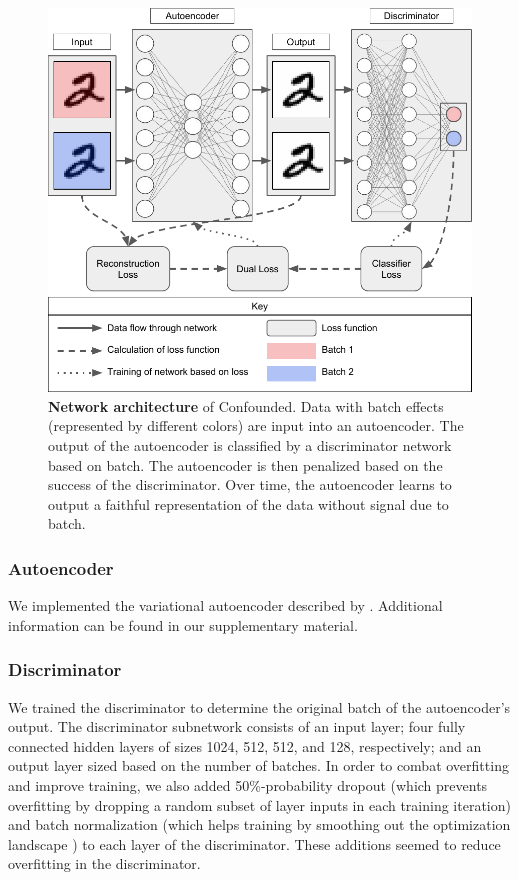 \documentclass[notitlepage]{article}
\begin{document}
\begin{figure}
	\centering
	\includegraphics[width=\columnwidth]{figures/final/network.pdf}
	\caption{\textbf{Network architecture} of Confounded.
	Data with batch effects (represented by different colors) are input into an autoencoder.
	The output of the autoencoder is classified by a discriminator network based on batch.
	The autoencoder is then penalized based on the success of the discriminator.
	Over time, the autoencoder learns to output a faithful representation of the data without signal due to batch.}
	\label{fig:network}
\end{figure}

\subsubsection{Autoencoder}

We implemented the variational autoencoder \cite{louizos_variational_2015} described by \citet[Chapter 15]{geron_hands-machine_2017}.
Additional information can be found in our supplementary material.

\subsubsection{Discriminator}

We trained the discriminator to determine the original batch of the autoencoder's output.
The discriminator subnetwork consists of an input layer; four fully connected hidden layers of sizes 1024, 512, 512, and 128, respectively; and an output layer sized based on the number of batches.
In order to combat overfitting and improve training, we also added 50\%-probability dropout \cite{srivastava_dropout_2014} (which prevents overfitting by dropping a random subset of layer inputs in each training iteration) and batch normalization \cite{ioffe_batch_2015} (which helps training by smoothing out the optimization landscape \citep{santurkar_how_2018}) to each layer of the discriminator.
These additions seemed to reduce overfitting in the discriminator.
\end{document}
